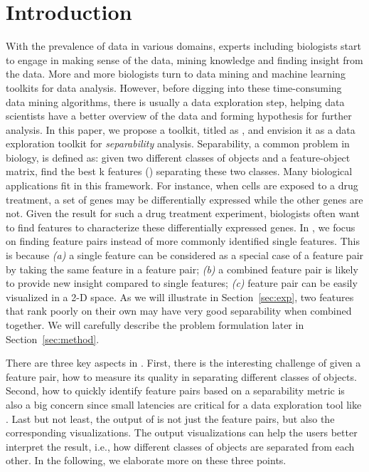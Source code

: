 

\section{Introduction}
\label{sec:intro}
With the prevalence of data in various domains, experts including biologists start to engage in making sense of the data, mining knowledge and finding insight from the data. 
More and more biologists turn to data mining and machine learning toolkits for data analysis. However, before digging into these time-consuming data mining algorithms, there is usually a data exploration step, helping data scientists have a better overview of the data and forming hypothesis for further analysis. In this paper, we propose a toolkit, titled as \genviz, and envision it as a data exploration toolkit for {\em separability} analysis. Separability, a common problem in biology, is defined as: given two different classes of objects and a feature-object matrix, find the best k features (\topk) separating these two classes. Many biological applications fit in this framework. For instance, when cells are exposed to a drug treatment, a set of genes may be differentially expressed while the other genes are not. Given the result for such a drug treatment experiment, biologists often want to find features to characterize these differentially expressed genes. 
In \genviz, we focus on finding \topk feature pairs instead of more commonly identified \topk single features. This is because 
{\em (a)} a single feature can be considered as a special case of a feature pair by taking the same feature in a feature pair;
{\em (b)} a combined feature pair is likely to provide new insight compared to single features;
{\em (c)} feature pair can be easily visualized in a 2-D space.
As we will illustrate in Section~\ref{sec:exp}, two features that rank poorly on their own may have very good separability when combined together. We will carefully describe the problem formulation later in Section~\ref{sec:method}. 


There are three key aspects in \genviz. First, there is the interesting challenge of given a feature pair, how to measure its quality in separating different classes of objects. Second, how to quickly identify \topk feature pairs based on a separability metric is also a big concern since small latencies are critical for a data exploration tool like \genviz. Last but not least, the output of \genviz is not just the \topk feature pairs, but also the corresponding visualizations. The output visualizations can help the users better interpret the result, i.e., how different classes of objects are separated from each other. In the following, we elaborate more on these three points. 



